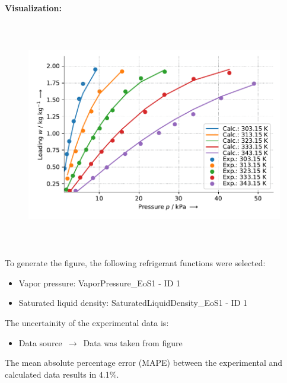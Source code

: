 \textbf{Visualization:}
%
\begin{figure}[!htp]
{\noindent\includegraphics[height=10cm, keepaspectratio]{figs/ads/ads_Ethanol_phenol_resin_composite_KOH6-PR_DubininAstakhov_1.pdf}}
\end{figure}
%

To generate the figure, the following refrigerant functions were selected:
\begin{itemize}
\item Vapor pressure: VaporPressure\_EoS1 - ID 1
\item Saturated liquid density: SaturatedLiquidDensity\_EoS1 - ID 1
\end{itemize}

The uncertainity of the experimental data is:
\begin{itemize}
\item Data source $\,\to\,$ Data was taken from figure
\end{itemize}

The mean absolute percentage error (MAPE) between the experimental and calculated data results in 4.1\%.
\FloatBarrier
\newpage
